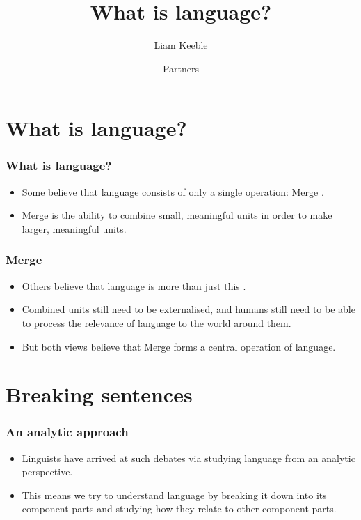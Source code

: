 \documentclass{beamer}
\title{What is language?}
\author{Liam Keeble}
\date{Partners}
\begin{document}
\begin{frame}
\maketitle
\end{frame}

\section{What is language?}

\begin{frame}
	\frametitle{What is language?}
	\begin{itemize}
		\item Some believe that language consists of only a single operation: Merge \cite{hauser2002faculty}.
		\item Merge is the ability to combine small, meaningful units in order to make larger, meaningful units.
		

	\end{itemize}

\end{frame}


\begin{frame}
	\frametitle{Merge}
	\begin{itemize}
		\item Others believe that language is more than just this \cite{jackendoff2005nature}.
	\item Combined units still need to be externalised, and humans still need to be able to process the relevance of language to the world around them.
	\item But both views believe that Merge forms a central operation of language.
	\end{itemize}

\end{frame}


\section{Breaking sentences}

\begin{frame}
	\frametitle{An analytic approach}
	\begin{itemize}
	\item Linguists have arrived at such debates via studying language from an analytic perspective.
	\item This means we try to understand language by breaking it down into its component parts and studying how they relate to other component parts.

	\end{itemize}

\end{frame}
\end{document}
